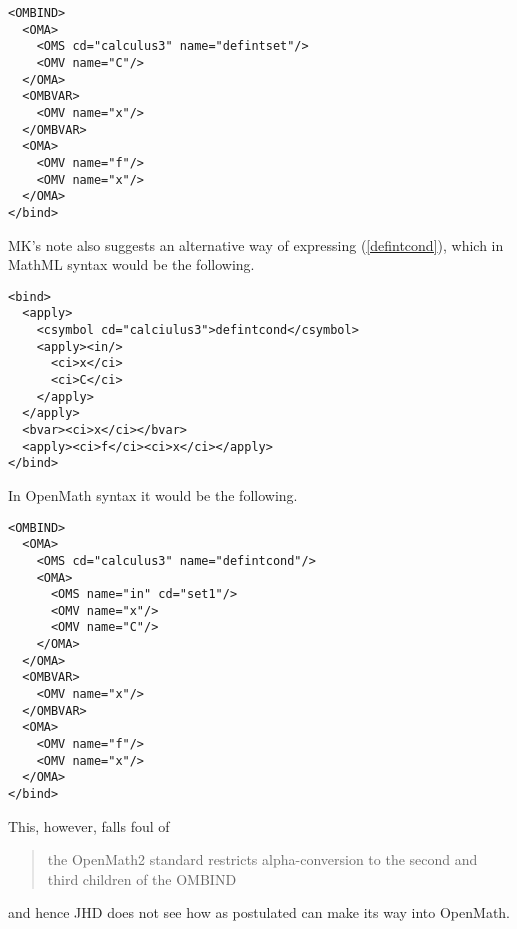 \documentclass{llncs}
\begin{document}
{\begin{lstlisting}
<OMBIND>
  <OMA>
    <OMS cd="calculus3" name="defintset"/>
    <OMV name="C"/>
  </OMA>
  <OMBVAR>
    <OMV name="x"/>
  </OMBVAR>
  <OMA>
    <OMV name="f"/>
    <OMV name="x"/>
  </OMA>
</bind>
\end{lstlisting}
MK's note also suggests an alternative way of expressing (\ref{defintcond}),
which in MathML syntax would be the following.
\begin{lstlisting}[language=MathML2]
<bind>
  <apply>
    <csymbol cd="calciulus3">defintcond</csymbol>
    <apply><in/>
      <ci>x</ci>
      <ci>C</ci>
    </apply>
  </apply>
  <bvar><ci>x</ci></bvar>
  <apply><ci>f</ci><ci>x</ci></apply>
</bind> 
\end{lstlisting}
In OpenMath syntax it would be the following.
\begin{lstlisting}
<OMBIND>
  <OMA>
    <OMS cd="calculus3" name="defintcond"/>
    <OMA>
      <OMS name="in" cd="set1"/>
      <OMV name="x"/>
      <OMV name="C"/>
    </OMA>
  </OMA>
  <OMBVAR>
    <OMV name="x"/>
  </OMBVAR>
  <OMA>
    <OMV name="f"/>
    <OMV name="x"/>
  </OMA>
</bind>
\end{lstlisting}
This, however, falls foul of %
\begin{quotation}\noindent\label{OMbound}
the OpenMath2 standard restricts alpha-conversion to the second and third
children of the OMBIND
\end{quotation}
and hence JHD does not see how {} as postulated can make its
way into OpenMath.
}
\end{document}
